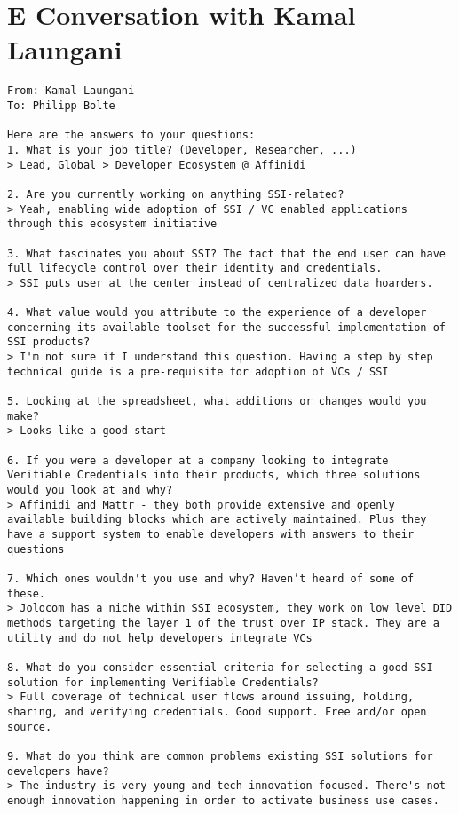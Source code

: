 \section*{E Conversation with Kamal Laungani}\label{appendix: laungani}
\begin{Verbatim}[breaklines=true, breaksymbol={}, breaksymbolsepleftnchars=2]
From: Kamal Laungani
To: Philipp Bolte

Here are the answers to your questions:
1. What is your job title? (Developer, Researcher, ...) 
> Lead, Global > Developer Ecosystem @ Affinidi

2. Are you currently working on anything SSI-related? 
> Yeah, enabling wide adoption of SSI / VC enabled applications through this ecosystem initiative 

3. What fascinates you about SSI? The fact that the end user can have full lifecycle control over their identity and credentials. 
> SSI puts user at the center instead of centralized data hoarders.

4. What value would you attribute to the experience of a developer concerning its available toolset for the successful implementation of SSI products? 
> I'm not sure if I understand this question. Having a step by step technical guide is a pre-requisite for adoption of VCs / SSI

5. Looking at the spreadsheet, what additions or changes would you make? 
> Looks like a good start

6. If you were a developer at a company looking to integrate Verifiable Credentials into their products, which three solutions would you look at and why? 
> Affinidi and Mattr - they both provide extensive and openly available building blocks which are actively maintained. Plus they have a support system to enable developers with answers to their questions

7. Which ones wouldn't you use and why? Haven’t heard of some of these. 
> Jolocom has a niche within SSI ecosystem, they work on low level DID methods targeting the layer 1 of the trust over IP stack. They are a utility and do not help developers integrate VCs

8. What do you consider essential criteria for selecting a good SSI solution for implementing Verifiable Credentials? 
> Full coverage of technical user flows around issuing, holding, sharing, and verifying credentials. Good support. Free and/or open source.

9. What do you think are common problems existing SSI solutions for developers have? 
> The industry is very young and tech innovation focused. There's not enough innovation happening in order to activate business use cases.


\end{Verbatim}


